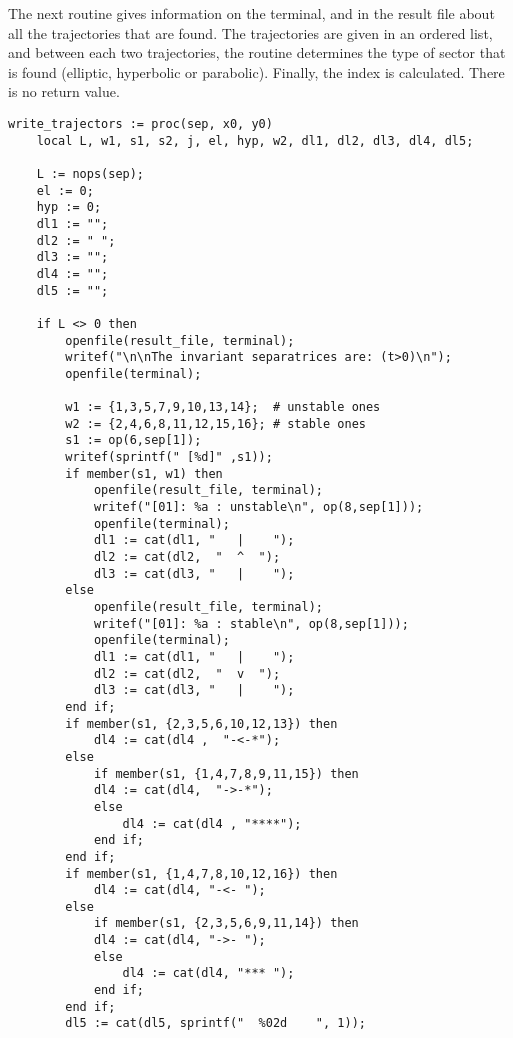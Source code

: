 \documentclass[a4paper,10pt]{article}
\begin{document}
The next routine gives information on the terminal, and in the result file about
all the trajectories that are found.  The trajectories are given in an ordered
list, and between each two trajectories, the routine determines the type of sector
that is found (elliptic, hyperbolic or parabolic).  Finally, the index is calculated.
There is no return value.

\begin{lstlisting}[name=blowup]
write_trajectors := proc(sep, x0, y0)
    local L, w1, s1, s2, j, el, hyp, w2, dl1, dl2, dl3, dl4, dl5;

    L := nops(sep);
    el := 0;
    hyp := 0;
    dl1 := "";
    dl2 := " ";
    dl3 := "";
    dl4 := "";
    dl5 := "";

    if L <> 0 then
        openfile(result_file, terminal);
        writef("\n\nThe invariant separatrices are: (t>0)\n");
        openfile(terminal);

        w1 := {1,3,5,7,9,10,13,14};  # unstable ones
        w2 := {2,4,6,8,11,12,15,16}; # stable ones
        s1 := op(6,sep[1]);
        writef(sprintf(" [%d]" ,s1));
        if member(s1, w1) then
            openfile(result_file, terminal);
            writef("[01]: %a : unstable\n", op(8,sep[1]));
            openfile(terminal);
            dl1 := cat(dl1, "   |    ");
            dl2 := cat(dl2,  "  ^  ");
            dl3 := cat(dl3, "   |    ");
        else
            openfile(result_file, terminal);
            writef("[01]: %a : stable\n", op(8,sep[1]));
            openfile(terminal);
            dl1 := cat(dl1, "   |    ");
            dl2 := cat(dl2,  "  v  ");
            dl3 := cat(dl3, "   |    ");
        end if;
        if member(s1, {2,3,5,6,10,12,13}) then
            dl4 := cat(dl4 ,  "-<-*");
        else
            if member(s1, {1,4,7,8,9,11,15}) then
            dl4 := cat(dl4,  "->-*");
            else
                dl4 := cat(dl4 , "****");
            end if;
        end if;
        if member(s1, {1,4,7,8,10,12,16}) then
            dl4 := cat(dl4, "-<- ");
        else
            if member(s1, {2,3,5,6,9,11,14}) then
            dl4 := cat(dl4, "->- ");
            else
                dl4 := cat(dl4, "*** ");
            end if;
        end if;
        dl5 := cat(dl5, sprintf("  %02d    ", 1));


\end{lstlisting}
\end{document}
